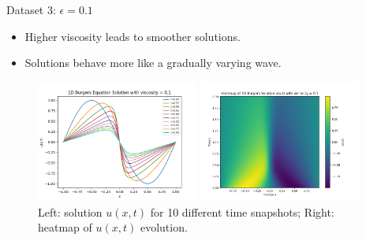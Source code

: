 \begin{secframe}

\begin{block}{Dataset 3: $\epsilon = 0.1$}
\begin{itemize}
  \item \small Higher viscosity leads to smoother solutions.
  \item \small Solutions behave more like a gradually varying wave.
\end{itemize}
\end{block}

\begin{figure}[h!]
    \centering
    \begin{minipage}[t]{0.48\linewidth}
        \centering
        \includegraphics[height=4.0cm]{images/graphical_visualization_1DBurgers_visc_01.png}
    \end{minipage}\hfill
    \begin{minipage}[t]{0.48\linewidth}
        \centering
        \includegraphics[height=4.0cm]{images/Heatmap_1DBurgers_visc_01.png}
    \end{minipage}
    \caption{\scriptsize Left: solution $u(x,t)$ for 10 different time snapshots; Right: heatmap of $u(x,t)$ evolution.}
\end{figure}

\end{secframe}

